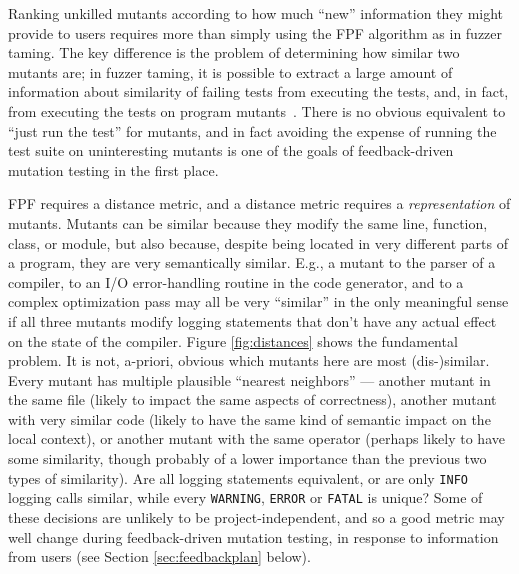Ranking unkilled mutants according to how much ``new'' information they might
provide to users requires more than simply using the FPF algorithm as
in fuzzer taming.  The key difference is the problem of determining
how similar two mutants are; in fuzzer taming, it is possible to
extract a large amount of information about similarity of failing
tests from executing the tests, and, in fact, from executing the tests
on program mutants~\cite{PLDI13,distMut}.  There is no obvious
equivalent to
``just run the test'' for mutants, and in fact avoiding the expense of running
the test suite on uninteresting mutants is one of the goals of
feedback-driven mutation testing in the first place.

FPF requires a distance metric, and a distance metric requires a
\emph{representation} of mutants.  Mutants can be similar because they
modify the same line, function, class, or module, but also because,
despite being located in very different parts of a program, they are
very semantically similar.  E.g., a mutant to the parser of a compiler, to
an I/O error-handling routine in the code generator, and to a complex
optimization pass may all be very ``similar'' in the only meaningful
sense if all three mutants modify logging statements that don't have
any actual effect on the state of the compiler.  Figure
\ref{fig:distances} shows the fundamental problem.  It is not,
a-priori, obvious which mutants here are most (dis-)similar.  Every
mutant has multiple plausible ``nearest neighbors'' --- another mutant
in the same file (likely to impact the same aspects of correctness),
another mutant with very similar code (likely to have the same kind of
semantic impact on the local context), or another mutant with the same operator (perhaps
likely to have some similarity, though probably of a lower importance
than the previous two types of similarity).  Are all logging statements
equivalent, or are only {\tt INFO} logging calls similar, while every
{\tt WARNING}, {\tt ERROR} or {\tt FATAL} is unique?  Some of these
decisions are unlikely to be project-independent, and so a good metric
may well change during feedback-driven mutation testing, in response
to information from users (see Section \ref{sec:feedbackplan} below).

